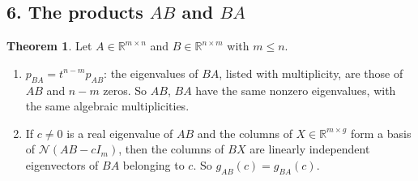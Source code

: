 \documentclass[12pt]{article}
\newcommand{\R}{\mathbb R}
\theoremstyle{definition}
\newtheorem{theorem}{Theorem}
\begin{document}
\subsection*{6. The products \(AB\) and \(BA\)}

\begin{theorem}\label{h-thm-AB-BA}
Let \(A\in\R^{m\times n}\) and \(B\in\R^{n\times m}\) with \(m\leqslant n\).
\begin{enumerate}
\item \(p_{BA}=t^{n-m}p_{AB}\): the eigenvalues of \(BA\), listed with multiplicity, are those of \(AB\) and \(n-m\)
zeros. So \(AB\), \(BA\) have the same nonzero eigenvalues, with the same algebraic multiplicities.
\item If \(c\ne0\) is a real eigenvalue of \(AB\) and the columns of \(X\in\R^{m\times g}\) form a basis of
\(\mathcal N(AB-cI_m)\), then the columns of \(BX\) are linearly independent eigenvectors of \(BA\) belonging to \(c\).
So \(g_{AB}(c)=g_{BA}(c)\).
\end{enumerate}
\end{theorem}
\end{document}
